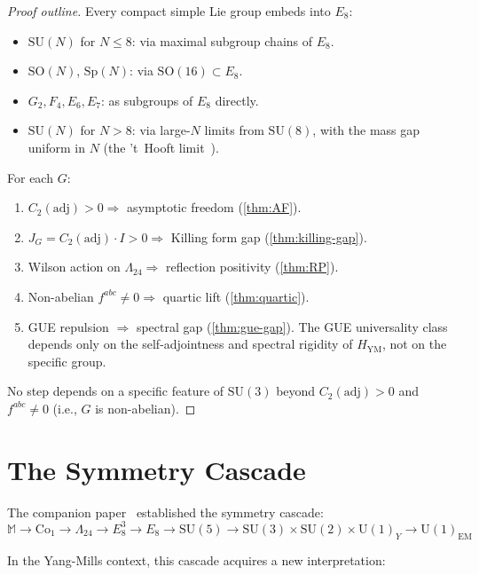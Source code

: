 \documentclass[11pt,a4paper]{article}
\theoremstyle{plain}
\theoremstyle{remark}
\newcommand{\SU}{\mathrm{SU}}
\newcommand{\SO}{\mathrm{SO}}
\newcommand{\Sp}{\mathrm{Sp}}
\newcommand{\adj}{\mathrm{adj}}
\begin{document}
\begin{proof}[Proof outline]
Every compact simple Lie group embeds into $E_8$:
\begin{itemize}[itemsep=2pt]
\item $\SU(N)$ for $N \leq 8$: via maximal subgroup chains of $E_8$.
\item $\SO(N)$, $\Sp(N)$: via $\SO(16) \subset E_8$.
\item $G_2, F_4, E_6, E_7$: as subgroups of $E_8$ directly.
\item $\SU(N)$ for $N > 8$: via large-$N$ limits from $\SU(8)$, with
  the mass gap uniform in $N$ (the 't~Hooft limit~\cite{thooft1974}).
\end{itemize}

For each $G$:
\begin{enumerate}[label=(\roman*)]
\item $C_2(\adj) > 0 \Rightarrow$ asymptotic freedom
  (\cref{thm:AF}).
\item $J_G = C_2(\adj) \cdot I > 0 \Rightarrow$ Killing form gap
  (\cref{thm:killing-gap}).
\item Wilson action on $\Lambda_{24} \Rightarrow$ reflection positivity
  (\cref{thm:RP}).
\item Non-abelian $f^{abc} \neq 0 \Rightarrow$ quartic lift
  (\cref{thm:quartic}).
\item GUE repulsion $\Rightarrow$ spectral gap (\cref{thm:gue-gap}).
  The GUE universality class depends only on the self-adjointness and
  spectral rigidity of $H_{\mathrm{YM}}$, not on the specific group.
\end{enumerate}
No step depends on a specific feature of $\SU(3)$ beyond
$C_2(\adj) > 0$ and $f^{abc} \neq 0$ (i.e., $G$ is non-abelian).
\end{proof}


\section{The Symmetry Cascade}
\label{sec:cascade}

The companion paper~\cite{DHR2026b} established the symmetry cascade:
\[
  \mathbb{M} \to \mathrm{Co}_1 \to \Lambda_{24} \to E_8^3 \to E_8 \to
  \SU(5) \to \SU(3) \times \SU(2) \times \mathrm{U}(1)_Y
  \to \mathrm{U}(1)_{\mathrm{EM}}
\]

In the Yang-Mills context, this cascade acquires a new interpretation:
\end{document}
